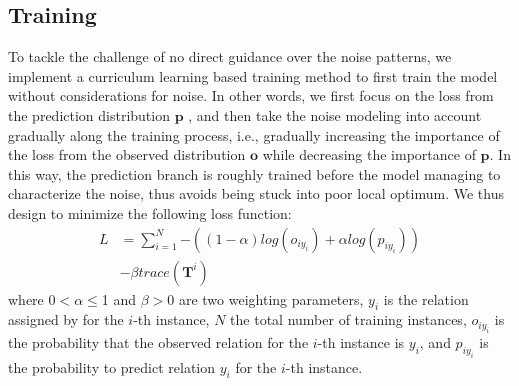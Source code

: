 \subsection{Training}
To tackle the challenge of no direct guidance over the noise patterns,
we implement a curriculum learning based training method to
first train the model without considerations for noise. In other words, we first focus on the loss from the prediction distribution $\mathbf{p}$ ,  and then take the noise modeling into account gradually along the training process, i.e., gradually increasing the importance of the loss from the observed distribution $\mathbf{o}$ while decreasing the importance of $\mathbf{p}$. In this way, the prediction branch is roughly trained before the model managing to characterize the noise, thus avoids being stuck into poor local optimum.
We thus design to minimize  the following loss function:
%
%
\begin{equation}
\begin{aligned}
L&=\sum_{i=1}^N{-((1-\alpha) log(o_{iy_{i}}) + \alpha log(p_{iy_{i}}))} \\
&- \beta trace(\mathbf{T}^{i})
\end{aligned}
\label{general_loss}
\end{equation}
where 0$<$$\alpha$$\le$1 and $\beta$$>$0 are two weighting parameters, $y_i$ is the relation assigned by \DS for the $i$-th  instance, $N$ the total number of training instances, $o_{iy_{i}}$ is the probability that the observed relation for the $i$-th instance is $y_i$, and $p_{iy_{i}}$ is the probability to predict relation $y_i$ for the $i$-th instance.

